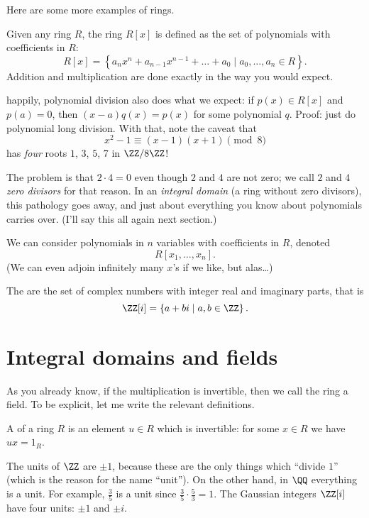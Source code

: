Here are some more examples of rings.
\begin{example}
	Given any ring $R$,
	the ring $R[x]$ is defined as the set of polynomials
	with coefficients in $R$:
	\[ R[x] = \left\{ a_nx^n+a_{n-1}x^{n-1}+\dots+a_0 \mid a_0, \dots, a_n \in R \right\}. \]
	Addition and multiplication are done exactly in the way you would expect.
\end{example}
\begin{remark}
	[Digression] happily, polynomial division also does what we expect: if $p(x) \in R[x]$
	and $p(a) = 0$, then $(x-a)q(x) = p(x)$ for some polynomial $q$.
	Proof: just do polynomial long division.
	With that, note the caveat that 
	\[ x^2-1 \equiv (x-1)(x+1) \pmod 8 \] has \emph{four} roots $1$, $3$, $5$, $7$ in
	$\ZZ/8\ZZ$!

	The problem is that $2 \cdot 4 = 0$ even though $2$ and $4$ are not zero;
	we call $2$ and $4$ \emph{zero divisors} for that reason.
	In an \emph{integral domain} (a ring without zero divisors), this pathology goes away,
	and just about everything you know about polynomials carries over.
	(I'll say this all again next section.)
\end{remark}
\begin{example}
	We can consider polynomials in $n$ variables with coefficients in $R$,
	denoted \[ R[x_1, \dots, x_n]. \]
	(We can even adjoin infinitely many $x$'s if we like, but alas\dots)
\end{example}
\begin{example}
	The  are the set of complex numbers
	with integer real and imaginary parts, that is
	\[ \ZZ[i] = \left\{ a+bi \mid a,b \in \ZZ \right\}. \]
\end{example}

\section{Integral domains and fields}

As you already know, if the multiplication is invertible,
then we call the ring a field.
To be explicit, let me write the relevant definitions.

\begin{definition}
	A  of a ring $R$
	is an element $u \in R$ which is invertible:
	for some $x \in R$ we have $ux = 1_R$.
\end{definition}
\begin{example}
	\listhack
	\begin{enumerate}[(a)]
	\ii The units of $\ZZ$ are $\pm 1$,
	because these are the only things which ``divide $1$''
	(which is the reason for the name ``unit'').
	\ii On the other hand, in $\QQ$ everything is a unit.
	For example, $\frac 35$ is a unit since $\frac 35 \cdot \frac 53 = 1$.
	\ii The Gaussian integers $\ZZ[i]$ have four units: $\pm 1$ and $\pm i$.
	\end{enumerate}
\end{example}

